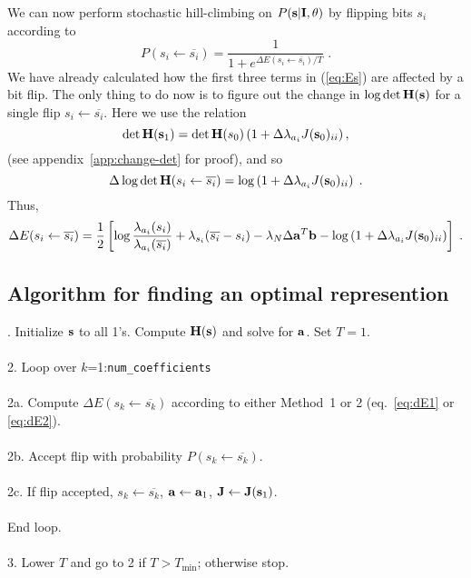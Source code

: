 \documentclass[12pt]{article}
\newcommand{\params}{\theta}
\newcommand{\ba}{{\bf a}}
\newcommand{\bs}{{\bf s}}
\newcommand{\bI}{{\bf I}}
\newcommand{\bb}{{\bf b}}
\def\lnot{\overline}
\newcommand{\flipsi}{s_i\leftarrow\lnot{s_i}}
\newcommand{\flipsk}{s_k\leftarrow\lnot{s_k}}
\newcommand{\bH}{{\bf H}}
\newcommand{\bJ}{{\bf J}}
\begin{document}
We can now perform stochastic hill-climbing on $P(\bs|\bI,\params)$ by
flipping bits $s_i$ according to
\begin{equation}
P(\flipsi) = \frac{1}{1 + e^{\Delta E(\flipsi)/T}} \; .
\end{equation}
We have already calculated how the first three terms in (\ref{eq:Es})
are affected by a bit flip.  The only thing to do now is to figure out
the change in $\log \det \bH(\bs)$ for a single flip $\flipsi$.  Here
we use the relation
\begin{equation}
\det \bH(\bs_1) = \det\bH(s_0) \, (1 + \Delta\lambda_{a_i} J(\bs_0)_{ii}) \, ,
\label{eq:change-det}
\end{equation}
(see appendix~\ref{app:change-det} for proof), and so
\begin{equation}
\Delta\log\det\bH(\flipsi) = 
  \log\left( 1 + \Delta\lambda_{a_i} J(\bs_0)_{ii} \right) \; .
\end{equation}
Thus,
\begin{equation}
\Delta E(\flipsi) = \frac{1}{2} 
 \left[ \log \frac{\lambda_{a_i}(s_i)}{\lambda_{a_i}(\lnot{s_i})}
        + \lambda_{s_i}(\lnot{s_i}-s_i) 
        -\lambda_N \Delta\ba^T \bb 
  - \log\left( 1 + \Delta\lambda_{a_i} J(\bs_0)_{ii} \right) \right] \; .
\label{eq:dE2}
\end{equation}


\subsection{Algorithm for finding an optimal represention}

. Initialize $\bs$ to all 1's.  Compute $\bH(\bs)$ and solve for $\ba$. 
Set $T=1$.\\
\\
2. Loop over $k$=1:{\tt num\_coefficients}\\
\\
\indent 2a. Compute $\Delta E(\flipsk)$ according to either Method~1 or 2 
            (eq.~\ref{eq:dE1} or \ref{eq:dE2}). \\
\\
\indent 2b. Accept flip with probability $P(\flipsk)$. \\
\\
\indent 2c. If flip accepted, $\flipsk$, $\ba \leftarrow \ba_1$, 
            $\bJ \leftarrow \bJ(\bs_1)$. \\
\\
\indent End loop.\\
\\
3. Lower $T$ and go to 2 if $T>T_{\mbox{min}}$;  otherwise stop.
\end{document}
